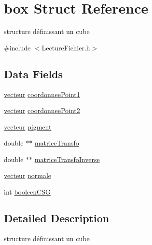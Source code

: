 \hypertarget{structbox}{
\section{box Struct Reference}
\label{structbox}
}


structure définissant un cube  




{\ttfamily \#include $<$LectureFichier.h$>$}

\subsection*{Data Fields}
\begin{DoxyCompactItemize}
\item 
\hyperlink{structvecteur}{vecteur} \hyperlink{structbox_a180a8d8578462a26294d0dc2d18ce3cf}{coordonneePoint1}
\item 
\hyperlink{structvecteur}{vecteur} \hyperlink{structbox_aabe806f54c4c0bae52e67e84c89f9942}{coordonneePoint2}
\item 
\hyperlink{structvecteur}{vecteur} \hyperlink{structbox_a5a4ee24431a1811fa1c8b75844198987}{pigment}
\item 
double $\ast$$\ast$ \hyperlink{structbox_aa06ccc348007e3355beccf412f2f656c}{matriceTransfo}
\item 
double $\ast$$\ast$ \hyperlink{structbox_acd7a3590501dcccfaefccbb658f83821}{matriceTransfoInverse}
\item 
\hyperlink{structvecteur}{vecteur} \hyperlink{structbox_a944738f40a0294270a0047acc5a77ee2}{normale}
\item 
int \hyperlink{structbox_a4428e32d4383f7dee25e5a4cb192da24}{booleenCSG}
\end{DoxyCompactItemize}


\subsection{Detailed Description}
structure définissant un cube 

